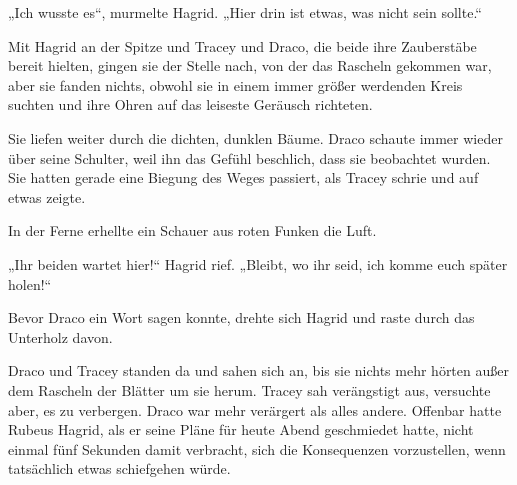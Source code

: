 „Ich wusste es“, murmelte Hagrid. „Hier drin ist etwas, was nicht sein sollte.“

Mit Hagrid an der Spitze und Tracey und Draco, die beide ihre Zauberstäbe bereit hielten, gingen sie der Stelle nach, von der das Rascheln gekommen war, aber sie fanden nichts, obwohl sie in einem immer größer werdenden Kreis suchten und ihre Ohren auf das leiseste Geräusch richteten.

Sie liefen weiter durch die dichten, dunklen Bäume. Draco schaute immer wieder über seine Schulter, weil ihn das Gefühl beschlich, dass sie beobachtet wurden. Sie hatten gerade eine Biegung des Weges passiert, als Tracey schrie und auf etwas zeigte.

In der Ferne erhellte ein Schauer aus roten Funken die Luft.

„Ihr beiden wartet hier!“ Hagrid rief. „Bleibt, wo ihr seid, ich komme euch später holen!“

Bevor Draco ein Wort sagen konnte, drehte sich Hagrid und raste durch das Unterholz davon.

Draco und Tracey standen da und sahen sich an, bis sie nichts mehr hörten außer dem Rascheln der Blätter um sie herum. Tracey sah verängstigt aus, versuchte aber, es zu verbergen. Draco war mehr verärgert als alles andere. Offenbar hatte Rubeus Hagrid, als er seine Pläne für heute Abend geschmiedet hatte, nicht einmal fünf Sekunden damit verbracht, sich die Konsequenzen vorzustellen, wenn tatsächlich etwas schiefgehen würde.

